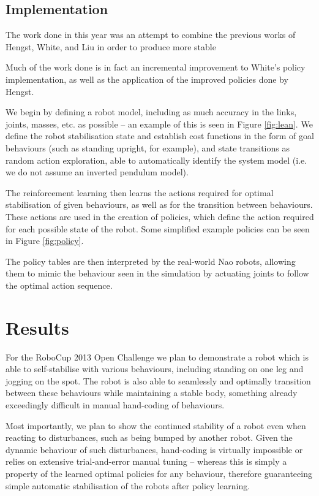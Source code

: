\subsection{}


\subsection{Implementation}
The work done in this year was an attempt to combine the previous works of Hengst, White, and Liu in order to produce more stable 



Much of the work done is in fact an incremental improvement to White's policy implementation, as well as the application of the improved policies done by Hengst.

We begin by defining a robot model, including as much accuracy in the links, joints, masses, etc. as possible -- an example of this is seen in Figure \ref{fig:lean}. We define the robot stabilisation state and establish cost functions in the form of goal behaviours (such as standing upright, for example), and state transitions as random action exploration, able to automatically identify the system model (i.e. we do not assume an inverted pendulum model). 

The reinforcement learning then learns the actions required for optimal stabilisation of given behaviours, as well as for the transition between behaviours. These actions are used in the creation of policies, which define the action required for each possible state of the robot. Some simplified example policies can be seen in Figure \ref{fig:policy}.

The policy tables are then interpreted by the real-world Nao robots, allowing them to mimic the behaviour seen in the simulation by actuating joints to follow the optimal action sequence.

\section{Results}
For the RoboCup 2013 Open Challenge we plan to demonstrate a robot which is able to self-stabilise with various behaviours, including standing on one leg and jogging on the spot. The robot is also able to seamlessly and optimally transition between these behaviours while maintaining a stable body, something already exceedingly difficult in manual hand-coding of behaviours.

Most importantly, we plan to show the continued stability of a robot even when reacting to disturbances, such as being bumped by another robot. Given the dynamic behaviour of such disturbances, hand-coding is virtually impossible or relies on extensive trial-and-error manual tuning -- whereas this is simply a property of the learned optimal policies for any behaviour, therefore guaranteeing simple automatic stabilisation of the robots after policy learning.


